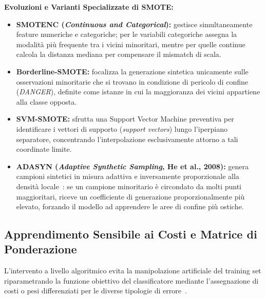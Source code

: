 \textbf{Evoluzioni e Varianti Specializzate di SMOTE:}
\begin{itemize}
    \item \textbf{SMOTENC (\textit{Continuous and Categorical}):} gestisce simultaneamente feature numeriche e categoriche; per le variabili categoriche assegna la modalità più frequente tra i vicini minoritari, mentre per quelle continue calcola la distanza mediana per compensare il mismatch di scala.
    \item \textbf{Borderline-SMOTE:} focalizza la generazione sintetica unicamente sulle osservazioni minoritarie che si trovano in condizione di pericolo di confine (\textit{DANGER}), definite come istanze in cui la maggioranza dei vicini appartiene alla classe opposta.
    \item \textbf{SVM-SMOTE:} sfrutta una Support Vector Machine preventiva per identificare i vettori di supporto (\textit{support vectors}) lungo l'iperpiano separatore, concentrando l'interpolazione esclusivamente attorno a tali coordinate limite.
    \item \textbf{ADASYN (\textit{Adaptive Synthetic Sampling}, He et al., 2008):} genera campioni sintetici in misura adattiva e inversamente proporzionale alla densità locale~\cite{he2008}: se un campione minoritario è circondato da molti punti maggioritari, riceve un coefficiente di generazione proporzionalmente più elevato, forzando il modello ad apprendere le aree di confine più ostiche.
\end{itemize}

\FloatBarrier
\subsection{Apprendimento Sensibile ai Costi e Matrice di Ponderazione}
\label{subsec:dm-cost-sensitive}

L'intervento a livello algoritmico evita la manipolazione artificiale del training set riparametrando la funzione obiettivo del classificatore mediante l'assegnazione di costi o pesi differenziati per le diverse tipologie di errore~\cite{mannocci2026imbalanced}.

